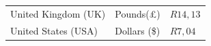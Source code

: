 \begin{enumerate}[noitemsep, label=\textbf{\arabic*}. ]
{\begin{tabular}[t]{|l|l|l|}
    
        United Kingdom (UK) &
    
    
        Pounds(£) &
    
    
        \begin{math}R14,13\end{math}%
     \tabularnewline\cline{1-1}\cline{2-2}\cline{3-3}
    
    
        United States (USA) &
    
    
        Dollars (\$) &
    
    
        \begin{math}R7,04\end{math}%
     \tabularnewline\cline{1-1}\cline{2-2}\cline{3-3}
    \end{tabular}} %
\end{enumerate}
